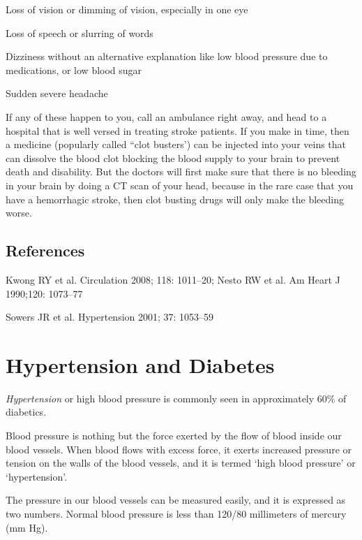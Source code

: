 \item Loss of vision or dimming of vision, especially in one eye

 \item Loss of speech or slurring of words

 \item Dizziness without an alternative explanation like low blood pressure due to medications, or low blood sugar

 \item Sudden severe headache

If any of these happen to you, call an ambulance right away, and head to a hospital that is well versed in treating stroke patients. If you make in time, then a medicine (popularly called “clot busters’) can be injected into your veins that can dissolve the blood clot blocking the blood supply to your brain to prevent death and disability. But the doctors will first make sure that there is no bleeding in your brain by doing a CT scan of your head, because in the rare case that you have a hemorrhagic stroke, then clot busting drugs will only make the bleeding worse.

\section*{References}

\begin{thebibliography}{99}
 Kwong RY et al. Circulation 2008; 118: 1011–20; Nesto RW et al. Am Heart J 1990;120: 1073–77

  Sowers JR et al. Hypertension 2001; 37: 1053–59

 \end{thebibliography}


\chapter{Hypertension and Diabetes}

\textit{Hypertension} or high blood pressure is commonly seen in approximately 60\% of diabetics.

Blood pressure is nothing but the force exerted by the flow of blood inside our blood vessels. When blood flows with excess force, it exerts increased pressure or tension on the walls of the blood vessels, and it is termed ‘high blood pressure’ or ‘hypertension’.

The pressure in our blood vessels can be measured easily, and it is expressed as two numbers. Normal blood pressure is less than 120/80 millimeters of mercury (mm Hg).

